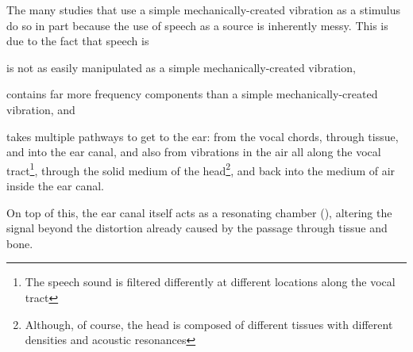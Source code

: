 The many studies that use a simple mechanically-created vibration as a stimulus do so in part because the use of speech as a source is inherently messy.  This is due to the fact that speech is 
\begin{enumerate*}[label={\alph*)}]
  \item  is not as easily manipulated as a simple mechanically-created vibration,
  \item  contains far more frequency components than a simple mechanically-created vibration, and 
  \item  takes multiple pathways to get to the ear: from the vocal chords, through tissue, and into the ear canal, and also from vibrations in the air all along the vocal tract\footnote{The speech sound is filtered differently at different locations along the vocal tract}, through the solid medium of the head\footnote{Although, of course, the head is composed of different tissues with different densities and acoustic resonances}, and back into the medium of air inside the ear canal.
\end{enumerate*}
% 
%
On top of this, the ear canal itself acts as a resonating chamber (\cite{rosen:91}), altering the signal beyond the distortion already caused by the passage through tissue and bone.  


